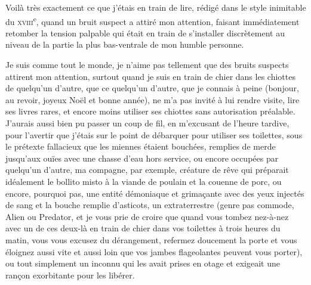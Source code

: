 Voilà très exactement ce que j’étais en train de lire, rédigé dans le style inimitable du \textsc{xviii}\textsuperscript{e}, quand un bruit suspect a attiré mon attention, faisant immédiatement retomber la tension palpable qui était en train de s’installer discrètement au niveau de la partie la plus bas-ventrale de mon humble personne.

%
Je suis comme tout le monde, je n’aime pas tellement que des bruits suspects attirent mon attention, surtout quand je suis en train de chier dans les chiottes de quelqu’un d’autre, que ce quelqu’un d’autre, que je connais à peine (bonjour, au revoir, joyeux Noël et bonne année), ne m’a pas invité à lui rendre visite, lire ses livres rares, et encore moins utiliser ses chiottes sans autorisation préalable. J’aurais aussi bien pu passer un coup de fil, en m’excusant de l’heure tardive, pour l’avertir que j’étais sur le point de débarquer pour utiliser ses toilettes, sous le prétexte fallacieux que les miennes étaient bouchées, remplies de merde jusqu’aux ouïes avec une chasse d’eau hors service, ou encore occupées par quelqu’un d’autre, ma compagne, par exemple, créature de rêve qui préparait idéalement le bollito misto à la viande de poulain et la couenne de porc, ou encore, pourquoi pas, une entité démoniaque et grimaçante avec des yeux injectés de sang et la bouche remplie d’asticots, un extraterrestre (genre pas commode, Alien ou Predator, et je vous prie de croire que quand vous tombez nez-à-nez avec un de ces deux-là en train de chier dans vos toilettes à trois heures du matin, vous vous excusez du dérangement, refermez doucement la porte et vous éloignez aussi vite et aussi loin que vos jambes flageolantes peuvent vous porter), ou tout simplement un inconnu qui les avait prises en otage et exigeait une rançon exorbitante pour les libérer.

